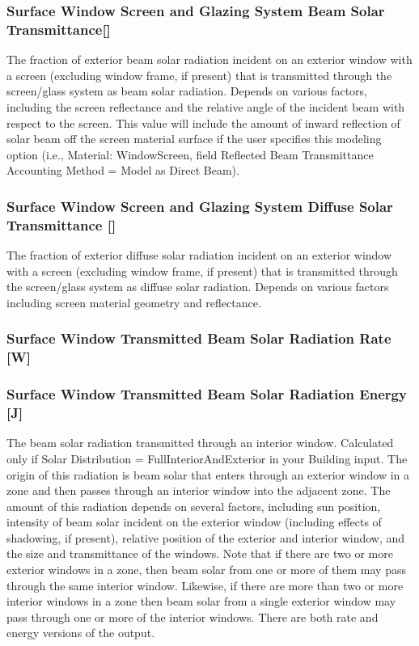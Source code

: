 \subsubsection{Surface Window Screen and Glazing System Beam Solar Transmittance{[]}}\label{surface-window-screen-and-glazing-system-beam-solar-transmittance}

The fraction of exterior beam solar radiation incident on an exterior window with a screen (excluding window frame, if present) that is transmitted through the screen/glass system as beam solar radiation. Depends on various factors, including the screen reflectance and the relative angle of the incident beam with respect to the screen. This value will include the amount of inward reflection of solar beam off the screen material surface if the user specifies this modeling option (i.e., Material: WindowScreen, field Reflected Beam Transmittance Accounting Method = Model as Direct Beam).

\subsubsection{Surface Window Screen and Glazing System Diffuse Solar Transmittance {[]}}\label{surface-window-screen-and-glazing-system-diffuse-solar-transmittance}

The fraction of exterior diffuse solar radiation incident on an exterior window with a screen (excluding window frame, if present) that is transmitted through the screen/glass system as diffuse solar radiation. Depends on various factors including screen material geometry and reflectance.

\subsubsection{Surface Window Transmitted Beam Solar Radiation Rate {[}W{]}}\label{surface-window-transmitted-beam-solar-radiation-rate-w-1}

\subsubsection{Surface Window Transmitted Beam Solar Radiation Energy {[}J{]}}\label{surface-window-transmitted-beam-solar-radiation-energy-j-1}

The beam solar radiation transmitted through an interior window. Calculated only if Solar Distribution = FullInteriorAndExterior in your Building input. The origin of this radiation is beam solar that enters through an exterior window in a zone and then passes through an interior window into the adjacent zone. The amount of this radiation depends on several factors, including sun position, intensity of beam solar incident on the exterior window (including effects of shadowing, if present), relative position of the exterior and interior window, and the size and transmittance of the windows. Note that if there are two or more exterior windows in a zone, then beam solar from one or more of them may pass through the same interior window. Likewise, if there are more than two or more interior windows in a zone then beam solar from a single exterior window may pass through one or more of the interior windows. There are both rate and energy versions of the output.

